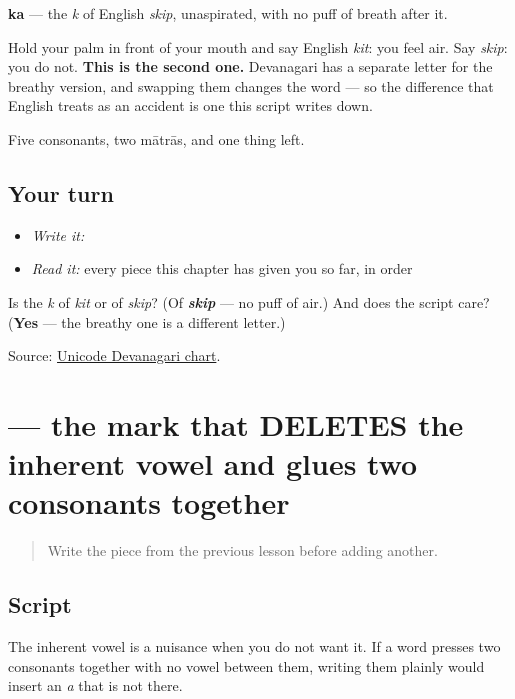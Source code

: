 \textbf{ka} — the \emph{k} of English \emph{skip}, unaspirated, with no puff of breath after it.

Hold your palm in front of your mouth and say English \emph{kit}: you feel air. Say \emph{skip}: you do not. \textbf{This is the second one.} Devanagari has a separate letter for the breathy version, and swapping them changes the word — so the difference that English treats as an accident is one this script writes down.

Five consonants, two mātrās, and one thing left.

\subsection*{Your turn}
\begin{itemize}
\raggedright
  \item \emph{Write it:} 
  \item \emph{Read it:} every piece this chapter has given you so far, in order
\end{itemize}

\begin{tcolorbox}[breakable,colback=teal!4,colframe=teal!35!black,title={Before you move on}]
Is \textbf{} the \emph{k} of \emph{kit} or of \emph{skip}? (Of \emph{\textbf{skip}} — no puff of air.) And does the script care? (\textbf{Yes} — the breathy one is a different letter.)

Source: \href{https://www.unicode.org/charts/PDF/U0900.pdf}{Unicode Devanagari chart}.
\end{tcolorbox}
\section[(virama)]{ — the mark that DELETES the inherent vowel and glues two consonants together}

\label{lesson:MR-W01-virama}



\begin{quote}
Write the piece from the previous lesson before adding another.
\end{quote}

\subsection*{Script}
The inherent vowel is a nuisance when you do not want it. If a word presses two consonants together with no vowel between them, writing them plainly would insert an \emph{a} that is not there.

